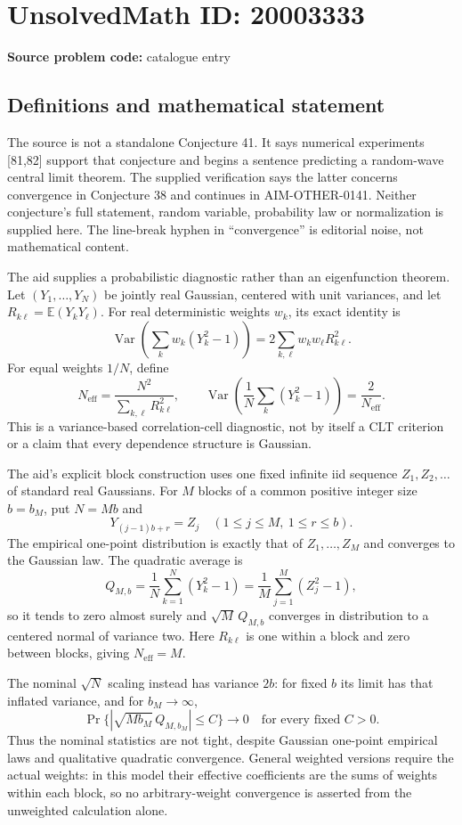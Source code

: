 \documentclass[11pt]{article}
\newcommand{\E}{\mathbb{E}}
\begin{document}
\section*{UnsolvedMath ID: 20003333}
\textbf{Source problem code:} catalogue entry
\subsection{Definitions and mathematical statement}
The source is not a standalone Conjecture 41. It says numerical experiments [81,82] support that conjecture and begins a sentence predicting a random-wave central limit theorem. The supplied verification says the latter concerns convergence in Conjecture 38 and continues in AIM-OTHER-0141. Neither conjecture's full statement, random variable, probability law or normalization is supplied here. The line-break hyphen in ``convergence'' is editorial noise, not mathematical content.

The aid supplies a probabilistic diagnostic rather than an eigenfunction theorem. Let $(Y_1,\ldots,Y_N)$ be jointly real Gaussian, centered with unit variances, and let $R_{k\ell}=\E(Y_kY_\ell)$. For real deterministic weights $w_k$, its exact identity is
\[
 \operatorname{Var}\left(\sum_kw_k(Y_k^2-1)\right)
 =2\sum_{k,\ell}w_kw_\ell R_{k\ell}^2.
\]
For equal weights $1/N$, define
\[
 N_{\mathrm{eff}}=\frac{N^2}{\sum_{k,\ell}R_{k\ell}^2},
 \qquad
 \operatorname{Var}\left(\frac1N\sum_k(Y_k^2-1)\right)
 =\frac2{N_{\mathrm{eff}}}.
\]
This is a variance-based correlation-cell diagnostic, not by itself a CLT criterion or a claim that every dependence structure is Gaussian.

The aid's explicit block construction uses one fixed infinite iid sequence $Z_1,Z_2,\ldots$ of standard real Gaussians. For $M$ blocks of a common positive integer size $b=b_M$, put $N=Mb$ and
\[
 Y_{(j-1)b+r}=Z_j\quad(1\leq j\leq M,\ 1\leq r\leq b).
\]
The empirical one-point distribution is exactly that of $Z_1,\ldots,Z_M$ and converges to the Gaussian law. The quadratic average is
\[
 Q_{M,b}=\frac1N\sum_{k=1}^N(Y_k^2-1)
 =\frac1M\sum_{j=1}^M(Z_j^2-1),
\]
so it tends to zero almost surely and $\sqrt M\,Q_{M,b}$ converges in distribution to a centered normal of variance two. Here $R_{k\ell}$ is one within a block and zero between blocks, giving $N_{\mathrm{eff}}=M$.

The nominal $\sqrt N$ scaling instead has variance $2b$: for fixed $b$ its limit has that inflated variance, and for $b_M\to\infty$,
\[
 \Pr\{|\sqrt{Mb_M}\,Q_{M,b_M}|\leq C\}\longrightarrow0
 \quad\text{for every fixed }C>0.
\]
Thus the nominal statistics are not tight, despite Gaussian one-point empirical laws and qualitative quadratic convergence. General weighted versions require the actual weights: in this model their effective coefficients are the sums of weights within each block, so no arbitrary-weight convergence is asserted from the unweighted calculation alone.
\end{document}
